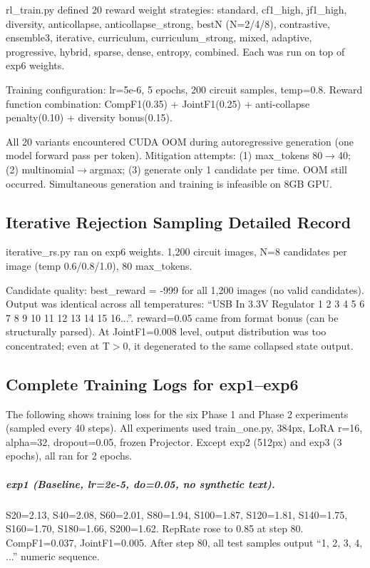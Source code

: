 rl\_train.py defined 20 reward weight strategies: standard, cf1\_high, jf1\_high, diversity, anticollapse, anticollapse\_strong, bestN (N=2/4/8), contrastive, ensemble3, iterative, curriculum, curriculum\_strong, mixed, adaptive, progressive, hybrid, sparse, dense, entropy, combined. Each was run on top of exp6 weights.

Training configuration: lr=5e-6, 5 epochs, 200 circuit samples, temp=0.8. Reward function combination: CompF1(0.35) + JointF1(0.25) + anti-collapse penalty(0.10) + diversity bonus(0.15).

All 20 variants encountered CUDA OOM during autoregressive generation (one model forward pass per token). Mitigation attempts: (1) max\_tokens 80$\to$40; (2) multinomial$\to$argmax; (3) generate only 1 candidate per time. OOM still occurred. Simultaneous generation and training is infeasible on 8GB GPU.

\subsection{Iterative Rejection Sampling Detailed Record}

iterative\_rs.py ran on exp6 weights. 1,200 circuit images, N=8 candidates per image (temp 0.6/0.8/1.0), 80 max\_tokens.

Candidate quality: best\_reward = -999 for all 1,200 images (no valid candidates). Output was identical across all temperatures: ``USB In 3.3V Regulator 1 2 3 4 5 6 7 8 9 10 11 12 13 14 15 16...''. reward=0.05 came from format bonus (can be structurally parsed). At JointF1=0.008 level, output distribution was too concentrated; even at T$>$0, it degenerated to the same collapsed state output.

\subsection{Complete Training Logs for exp1--exp6}

The following shows training loss for the six Phase 1 and Phase 2 experiments (sampled every 40 steps). All experiments used train\_one.py, 384px, LoRA r=16, alpha=32, dropout=0.05, frozen Projector. Except exp2 (512px) and exp3 (3 epochs), all ran for 2 epochs.

\subparagraph{exp1 (Baseline, lr=2e-5, do=0.05, no synthetic text).}
S20=2.13, S40=2.08, S60=2.01, S80=1.94, S100=1.87, S120=1.81, S140=1.75, S160=1.70, S180=1.66, S200=1.62. RepRate rose to 0.85 at step 80. CompF1=0.037, JointF1=0.005. After step 80, all test samples output ``1, 2, 3, 4, ...'' numeric sequence.

